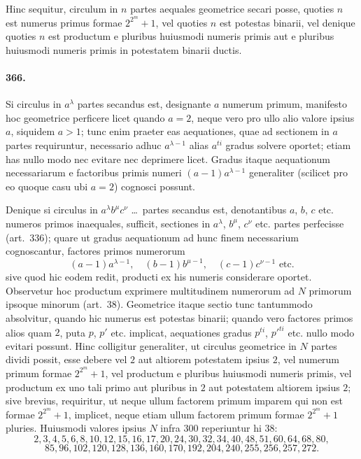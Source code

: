 \documentclass[12pt,a4paper]{article}
\theoremstyle{plain}
\theoremstyle{definition}
\theoremstyle{remark}
\begin{document}
Hinc sequitur, circulum in $n$ partes aequales geometrice secari posse,
quoties $n$ est numerus primus formae $2^{2^m} + 1$, vel quoties $n$ est
potestas binarii, vel denique quoties $n$ est productum e pluribus
huiusmodi numeris primis aut e pluribus huiusmodi numeris primis in
potestatem binarii ductis.

\paragraph{366.}
Si circulus in $a^\lambda$ partes secandus est, designante $a$ numerum primum,
manifesto hoc geometrice perficere licet quando $a = 2$, neque vero pro
ullo alio valore ipsius $a$, siquidem $a > 1$; tunc enim praeter eas
aequationes, quae ad sectionem in $a$ partes requiruntur, necessario adhuc
$a^{\lambda-1}$ alias $a^{ti}$ gradus solvere oportet; etiam has nullo modo nec
evitare nec deprimere licet. Gradus itaque aequationum necessariarum e
factoribus primis numeri $(a-1)a^{\lambda-1}$ generaliter (scilicet pro eo
quoque casu ubi $a = 2$) cognosci possunt.

Denique si circulus in $a^\lambda b^\mu c^\nu$ \ldots\ partes secandus est,
denotantibus $a$, $b$, $c$ etc. numeros primos inaequales, sufficit,
sectiones in $a^\lambda$, $b^\mu$, $c^\nu$ etc. partes perfecisse (art.~336);
quare ut gradus aequationum ad hunc finem necessarium cognoscantur,
factores primos numerorum
\[
(a-1)a^{\lambda-1}, \quad (b-1)b^{\mu-1}, \quad (c-1)c^{\nu-1} \text{ etc.}
\]
sive quod hic eodem redit, producti ex his numeris considerare oportet.
Observetur hoc productum exprimere multitudinem numerorum ad $N$ primorum
ipsoque minorum (art.~38). Geometrice itaque sectio tunc tantummodo
absolvitur, quando hic numerus est potestas binarii; quando vero factores
primos alios quam $2$, puta $p$, $p'$ etc. implicat, aequationes gradus
$p^{ti}$, $p'^{ti}$ etc. nullo modo evitari possunt. Hinc colligitur
generaliter, ut circulus geometrice in $N$ partes dividi possit, esse debere
vel $2$ aut altiorem potestatem ipsius $2$, vel numerum primum formae
$2^{2^m} + 1$, vel productum e pluribus huiusmodi numeris primis, vel
productum ex uno tali primo aut pluribus in $2$ aut potestatem altiorem
ipsius $2$; sive brevius, requiritur, ut neque ullum factorem primum
imparem qui non est formae $2^{2^m} + 1$, implicet, neque etiam ullum
factorem primum formae $2^{2^m} + 1$ pluries. Huiusmodi valores ipsius
$N$ infra $300$ reperiuntur hi $38$:
\[
2, 3, 4, 5, 6, 8, 10, 12, 15, 16, 17, 20, 24, 30, 32, 34, 40, 48, 51, 60, 64, 68, 80,
\]
\[
85, 96, 102, 120, 128, 136, 160, 170, 192, 204, 240, 255, 256, 257, 272.
\]
\end{document}
